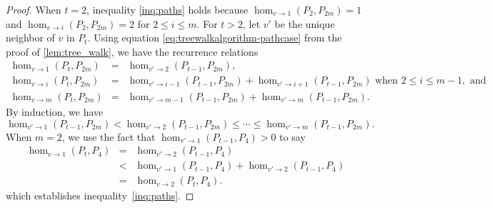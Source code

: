 \documentclass[10pt,a4paper]{amsart}
\newcommand{\homclass}[4]{\hom_{#1\to#2}(#3,#4)}
\begin{document}
\begin{proof}
When $t=2$, inequality \eqref{inq:paths} holds because $\homclass{v}{1}{P_2}{P_{2m}}=1$ and $\homclass{v}{i}{P_2}{P_{2m}}=2$ for $2 \le i \le m$. For $t > 2$, let $v'$ be the unique neighbor of $v$ in $P_t$. Using equation \eqref{eq:treewalkalgorithm-pathcase} from the proof of \cref{lem:tree_walk}, we have the recurrence relations
\begin{eqnarray*}
\homclass{v}{1}{P_t}{P_{2m}} & = & \homclass{v'}{2}{P_{t-1}}{P_{2m}}, \\
\homclass{v}{i}{P_t}{P_{2m}} & = & \homclass{v'}{i-1}{P_{t-1}}{P_{2m}} + \homclass{v'}{i+1}{P_{t-1}}{P_{2m}} \text{ when } 2 \le i \le m-1, \text{ and} \\
\homclass{v}{m}{P_t}{P_{2m}} & = & \homclass{v'}{m-1}{P_{t-1}}{P_{2m}} + \homclass{v'}{m}{P_{t-1}}{P_{2m}}.
\end{eqnarray*}
By induction, we have
\begin{equation}\label{inq:path_induction}
\homclass{v'}{1}{P_{t-1}}{P_{2m}} < \homclass{v'}{2}{P_{t-1}}{P_{2m}} \le \cdots \le \homclass{v'}{m}{P_{t-1}}{P_{2m}}.
\end{equation}
When $m=2$, we use the fact that $\homclass{v'}{1}{P_{t-1}}{P_{4}} > 0$ to say
\begin{eqnarray*}
\homclass{v}{1}{P_t}{P_{4}} &=& \homclass{v'}{2}{P_{t-1}}{P_{4}} \\
	&<& \homclass{v'}{1}{P_{t-1}}{P_{4}} + \homclass{v'}{2}{P_{t-1}}{P_{4}} \\
	&=& \homclass{v}{2}{P_t}{P_4}.
\end{eqnarray*}
which establishes inequality~\eqref{inq:paths}.


\end{proof}
\end{document}
